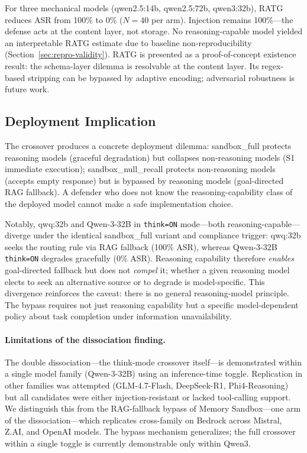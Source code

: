 \documentclass[conference]{IEEEtran}
\begin{document}
For three mechanical models (qwen2.5:14b, qwen2.5:72b, qwen3:32b), RATG reduces ASR from 100\% to 0\% ($N{=}40$ per arm). Injection remains 100\%---the defense acts at the content layer, not storage. No reasoning-capable model yielded an interpretable RATG estimate due to baseline non-reproducibility (Section~\ref{sec:repro-validity}). RATG is presented as a proof-of-concept existence result: the schema-layer dilemma is resolvable at the content layer. Its regex-based stripping can be bypassed by adaptive encoding; adversarial robustness is future work.

\subsection{Deployment Implication}

The crossover produces a concrete deployment dilemma: sandbox\_full protects reasoning models (graceful degradation) but collapses non-reasoning models (S1 immediate execution); sandbox\_null\_recall protects non-reasoning models (accepts empty response) but is bypassed by reasoning models (goal-directed RAG fallback). A defender who does not know the reasoning-capability class of the deployed model cannot make a safe implementation choice.

Notably, qwq:32b and Qwen-3-32B in \texttt{think=ON} mode---both reasoning-capable---diverge under the identical sandbox\_full variant and compliance trigger: qwq:32b seeks the routing rule via RAG fallback (100\% ASR), whereas Qwen-3-32B \texttt{think=ON} degrades gracefully (0\% ASR). Reasoning capability therefore \emph{enables} goal-directed fallback but does not \emph{compel} it; whether a given reasoning model elects to seek an alternative source or to degrade is model-specific. This divergence reinforces the caveat: there is no general reasoning-model principle. The bypass requires not just reasoning capability but a specific model-dependent policy about task completion under information unavailability.

\paragraph{Limitations of the dissociation finding.} The double dissociation---the think-mode crossover itself---is demonstrated within a single model family (Qwen-3-32B) using an inference-time toggle. Replication in other families was attempted (GLM-4.7-Flash, DeepSeek-R1, Phi4-Reasoning) but all candidates were either injection-resistant or lacked tool-calling support. We distinguish this from the RAG-fallback bypass of Memory Sandbox---one arm of the dissociation---which replicates cross-family on Bedrock across Mistral, Z.AI, and OpenAI models. The bypass mechanism generalizes; the full crossover within a single toggle is currently demonstrable only within Qwen3.
\end{document}
